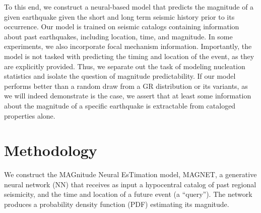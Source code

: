 \documentclass[pdflatex]{sn-jnl}
\newcommand{\neri}[1]{{\textcolor{cyan}{#1}}}
\begin{document}

To this end, we construct a neural-based model that predicts the magnitude of a given earthquake given the short and long term seismic history prior to its occurrence. Our model is trained on seismic catalogs containing information about past earthquakes, including location, time, and magnitude. In some experiments, we also incorporate focal mechanism information. Importantly, the model is not tasked with predicting the timing and location of the event, as they are explicitly provided. Thus, we separate out the task of modeling nucleation statistics and isolate the question of magnitude predictability. If our model performs better than a random draw from a GR distribution or its variants, as we will indeed demonstrate is the case, we assert that at least some information about the magnitude of a specific earthquake is extractable from cataloged properties alone. 





\section{Methodology}
We construct the MAGnitude Neural EsTimation model, MAGNET, a generative neural network (NN) that receives as input a hypocentral catalog of past regional seismicity, and the time and location of a future event (a ``query''). The network produces a probability density function (PDF) estimating its magnitude. 
\end{document}

